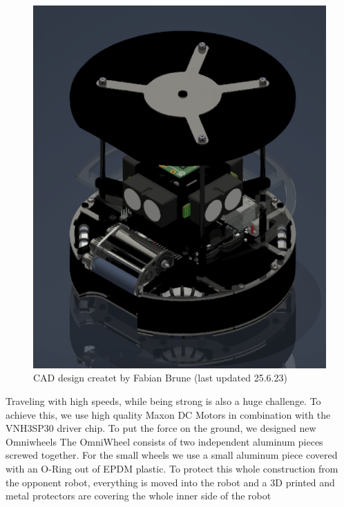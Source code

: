\documentclass{scrartcl}
\begin{document}
\begin{figure}
    \centering
    \includegraphics[width=\textwidth]{img/Roboter Home.png}
    \caption{CAD design createt by Fabian Brune (last updated 25.6.23)}
    \label{fig:roboter}
\end{figure}


Traveling with high speeds, while being strong is also a huge challenge. To achieve this, we use high quality
Maxon DC Motors in combination with the VNH3SP30 driver chip. To put the force on the ground, we designed
new Omniwheels
The OmniWheel consists of two independent aluminum pieces screwed together. For the small wheels we use a small
aluminum piece covered with an O-Ring out of EPDM plastic.
\newline
To protect this whole construction from the opponent robot, everything is moved into the robot and a 3D
printed and metal protectors are covering the whole inner side of the robot%
\newpage
\end{document}

